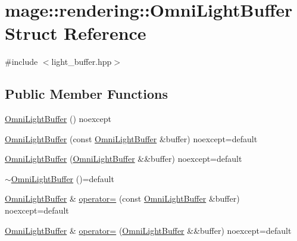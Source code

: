 \hypertarget{structmage_1_1rendering_1_1_omni_light_buffer}{}\section{mage\+:\+:rendering\+:\+:Omni\+Light\+Buffer Struct Reference}
\label{structmage_1_1rendering_1_1_omni_light_buffer}


{\ttfamily \#include $<$light\+\_\+buffer.\+hpp$>$}

\subsection*{Public Member Functions}
\begin{DoxyCompactItemize}
\item 
\hyperlink{structmage_1_1rendering_1_1_omni_light_buffer_a7429503e161d324c66ecad2250bc69a2}{Omni\+Light\+Buffer} () noexcept
\item 
\hyperlink{structmage_1_1rendering_1_1_omni_light_buffer_a716417506a93d27a0093b408e88f92e4}{Omni\+Light\+Buffer} (const \hyperlink{structmage_1_1rendering_1_1_omni_light_buffer}{Omni\+Light\+Buffer} \&buffer) noexcept=default
\item 
\hyperlink{structmage_1_1rendering_1_1_omni_light_buffer_a8a1a458735f88d1dbd86590f1807c0a4}{Omni\+Light\+Buffer} (\hyperlink{structmage_1_1rendering_1_1_omni_light_buffer}{Omni\+Light\+Buffer} \&\&buffer) noexcept=default
\item 
\hyperlink{structmage_1_1rendering_1_1_omni_light_buffer_a67eee7a5d21a124ffe74cd5ae94196b6}{$\sim$\+Omni\+Light\+Buffer} ()=default
\item 
\hyperlink{structmage_1_1rendering_1_1_omni_light_buffer}{Omni\+Light\+Buffer} \& \hyperlink{structmage_1_1rendering_1_1_omni_light_buffer_a915b047abdc1068279b8308b189b60f5}{operator=} (const \hyperlink{structmage_1_1rendering_1_1_omni_light_buffer}{Omni\+Light\+Buffer} \&buffer) noexcept=default
\item 
\hyperlink{structmage_1_1rendering_1_1_omni_light_buffer}{Omni\+Light\+Buffer} \& \hyperlink{structmage_1_1rendering_1_1_omni_light_buffer_a5dc568c33ce2343aaf76c82aaaffa921}{operator=} (\hyperlink{structmage_1_1rendering_1_1_omni_light_buffer}{Omni\+Light\+Buffer} \&\&buffer) noexcept=default
\end{DoxyCompactItemize}
